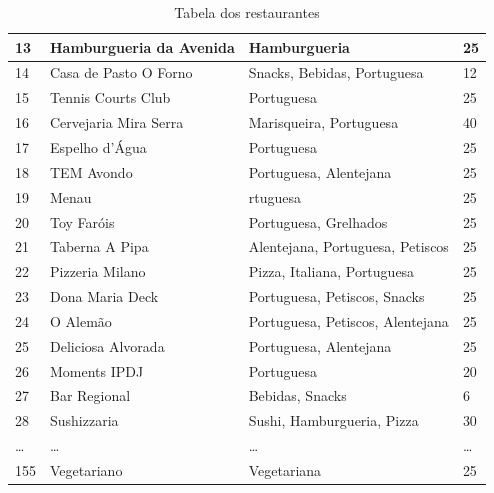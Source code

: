 \documentclass[a4paper,10pt]{article}
\begin{document}
\begin{table}[!ht]
\begin{tabular}{|l|l|l|l|}
    13     & Hamburgueria da Avenida     & Hamburgueria                        & 25     \\ \hline
    14     & Casa de Pasto O Forno       & Snacks, Bebidas, Portuguesa         & 12     \\ \hline
    15     & Tennis Courts Club          & Portuguesa                          & 25     \\ \hline
    16     & Cervejaria Mira Serra       & Marisqueira, Portuguesa             & 40     \\ \hline
    17     & Espelho d'Água              & Portuguesa                          & 25     \\ \hline
    18     & TEM Avondo                  & Portuguesa, Alentejana              & 25     \\ \hline
    19     & Menau                       & rtuguesa                            & 25     \\ \hline
    20     & Toy Faróis                  & Portuguesa, Grelhados               & 25     \\ \hline
    21     & Taberna A Pipa              & Alentejana, Portuguesa, Petiscos    & 25     \\ \hline
    22     & Pizzeria Milano             & Pizza, Italiana, Portuguesa         & 25     \\ \hline
    23     & Dona Maria Deck             & Portuguesa, Petiscos, Snacks        & 25     \\ \hline
    24     & O Alemão                    & Portuguesa, Petiscos, Alentejana    & 25     \\ \hline
    25     & Deliciosa Alvorada          & Portuguesa, Alentejana              & 25     \\ \hline
    26     & Moments IPDJ                & Portuguesa                          & 20     \\ \hline
    27     & Bar Regional                & Bebidas, Snacks                     & 6      \\ \hline
    28     & Sushizzaria                 & Sushi, Hamburgueria, Pizza          & 30     \\ \hline
    \ldots & \ldots                      & \ldots                              & \ldots \\ \hline
    155    & Vegetariano                 & Vegetariana                         & 25     \\ \hline
  \end{tabular}
  \caption{Tabela dos restaurantes}
\end{table}
\end{document}
